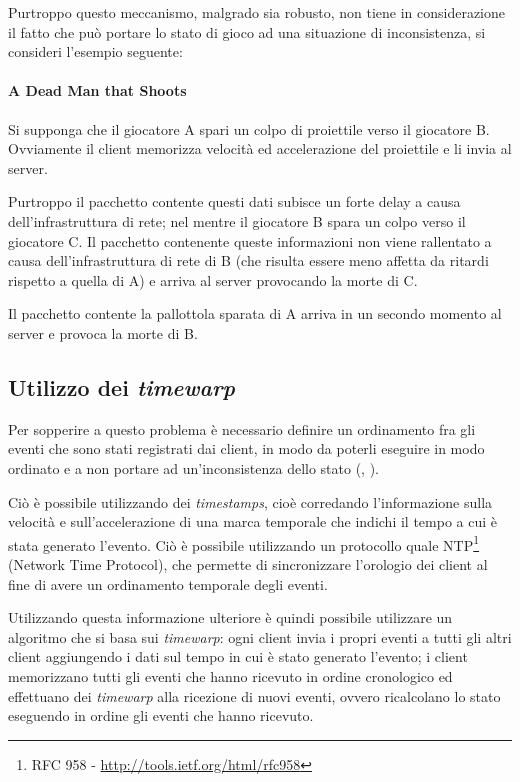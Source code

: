\documentclass[a4paper,11pt]{article}
\begin{document}
Purtroppo questo meccanismo, malgrado sia robusto, non tiene in considerazione il fatto che pu\`o portare lo stato di gioco ad una situazione di inconsistenza, si consideri l'esempio seguente:

\paragraph{A Dead Man that Shoots}

Si supponga che il giocatore A spari un colpo di proiettile verso il giocatore B. Ovviamente il client memorizza velocit\`a ed accelerazione del proiettile e li invia al server.

Purtroppo il pacchetto contente questi dati subisce un forte delay a causa dell'infrastruttura di rete; nel mentre il giocatore B spara un colpo verso il giocatore C. Il pacchetto contenente queste informazioni non viene rallentato a causa dell'infrastruttura di rete di B (che risulta essere meno affetta da ritardi rispetto a quella di A) e arriva al server provocando la morte di C.

Il pacchetto contente la pallottola sparata di A arriva in un secondo momento al server e provoca la morte di B.

\subsection{Utilizzo dei \emph{timewarp}}

Per sopperire a questo problema \`e necessario definire un ordinamento fra gli eventi che sono stati registrati dai client, in modo da poterli eseguire in modo ordinato e a non portare ad un'inconsistenza dello stato (\cite{rif3}, \cite{rif4}).

Ci\`o \`e possibile utilizzando dei \emph{timestamps}, cio\`e corredando l'informazione sulla velocit\`a e sull'accelerazione di una marca temporale che indichi il tempo a cui \`e stata generato l'evento. Ci\`o \`e possibile utilizzando un protocollo quale NTP\footnote{RFC 958 - \url{http://tools.ietf.org/html/rfc958}} (Network Time Protocol), che permette di sincronizzare l'orologio dei client al fine di avere un ordinamento temporale degli eventi.

Utilizzando questa informazione ulteriore \`e quindi possibile utilizzare un algoritmo che si basa sui \emph{timewarp}: ogni client invia i propri eventi a tutti gli altri client aggiungendo i dati sul tempo in cui \`e stato generato l'evento; i client memorizzano tutti gli eventi che hanno ricevuto in ordine cronologico ed effettuano dei \emph{timewarp} alla ricezione di nuovi eventi, ovvero ricalcolano lo stato eseguendo in ordine gli eventi che hanno ricevuto.
\end{document}
